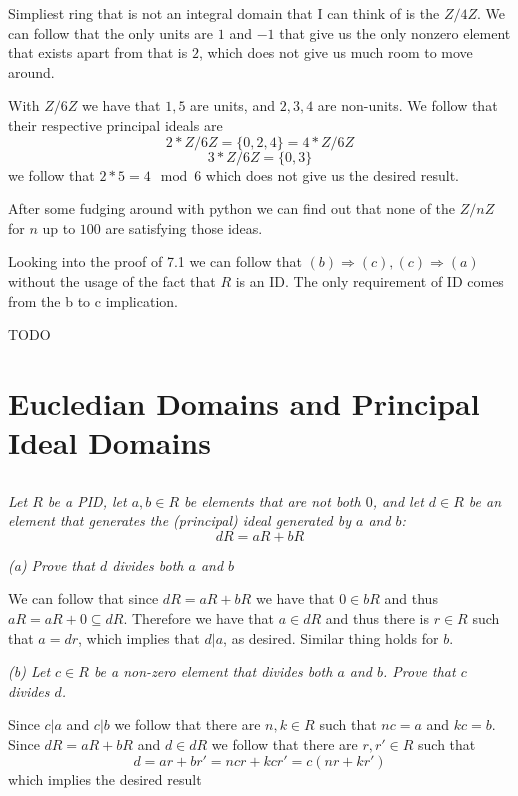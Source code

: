 \documentclass[11pt,oneside,titlepage]{book}
\DeclareMathOperator \ra {\Rightarrow}
\newcommand{\set}[1]{\{ #1 \}}
\begin{document}
Simpliest ring that is not an integral domain that I can think of is
the $Z/4Z$. We can follow that the only units are $1$ and $-1$ that
give us the only nonzero element that exists apart from that is $2$,
which does not give us much room to move around.

With $Z/6Z$ we have that $1, 5$ are units, and $2, 3, 4$ are
non-units. We follow that their respective principal ideals are
$$2 * Z/6Z = \set{0, 2, 4} = 4 * Z/6Z$$
$$3 * Z/6Z = \set{0, 3}$$
we follow that $2 * 5 = 4 \mod 6$ which does not give us the desired
result.

After some fudging around with python we can find out that none of
the $Z/nZ$ for $n$ up to $100$ are satisfying those ideas.

Looking into the proof of 7.1 we can follow that $(b) \ra (c),
(c) \ra (a)$ without the usage of the fact that $R$ is an ID.
The only requirement of ID comes from the b to c implication.

TODO

\section{Eucledian Domains and Principal Ideal Domains}

\subsection{}

\textit{Let $R$ be a PID, let $a, b \in R$ be elements that are not
  both $0$, and let $d \in R$ be an element that generates the
  (principal) ideal generated by $a$ and $b$:
  $$dR = aR + bR$$}

\textit{(a) Prove that $d$ divides both $a$ and $b$}

We can follow that since $dR = aR + bR$ we have that $0 \in bR$ and
thus $aR = aR + 0 \subseteq dR$. Therefore we have that $a \in dR$ and
thus there is $r \in R$ such that $a = dr$, which implies that $d |
a$, as desired. Similar thing holds for $b$.


\textit{(b) Let $c \in R$ be a non-zero element that divides both $a$
  and $b$. Prove that $c$ divides $d$.}

Since $c \vert a$ and $c \vert b$ we follow that there are $n, k \in R$
such that $nc = a$ and $kc = b$. Since $dR = aR + bR$ and $d \in dR$
we follow that there are $r, r' \in R$ such that
$$d = ar + br' = ncr + kcr' = c(nr + kr')$$
which implies the desired result
\end{document}

